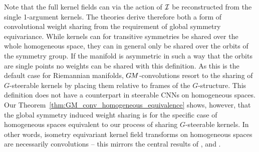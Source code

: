 Note that the full kernel fields can via the action of $\mathcal{I}$ be reconstructed from the single 1-argument kernels.
The theories derive therefore both a form of convolutional weight sharing from the requirement of global symmetry equivariance.
While kernels can for transitive symmetries be shared over the whole homogeneous space, they can in general only be shared over the orbits of the symmetry group.
If the manifold is asymmetric in such a way that the orbits are single points no weights can be shared with this definition.
As this is the default case for Riemannian manifolds, $G\mkern-1.4muM$-convolutions resort to the sharing of $G$-steerable kernels by placing them relative to frames of the $G$-structure.
This definition does not have a counterpart in steerable CNNs on homogeneous spaces.
Our Theorem~\ref{thm:GM_conv_homogeneous_equivalence} shows, however, that the global symmetry induced weight sharing is for the specific case of homogeneous spaces equivalent to our process of sharing $G$-steerable kernels.
In other words, isometry equivariant kernel field transforms on homogeneous spaces are necessarily convolutions
-- this mirrors the central results of \citet{Kondor2018-GENERAL}, \citet{bekkers2020bspline} and \citet{Cohen2018-intertwiners}\cite{Cohen2019-generaltheory}.


